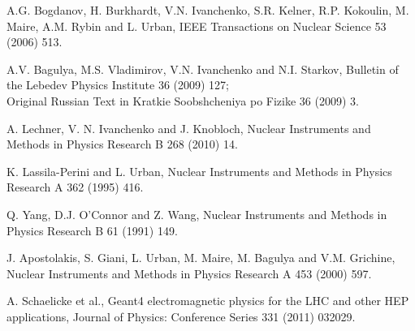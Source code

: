 
 A.G. Bogdanov, H. Burkhardt, V.N. Ivanchenko, S.R. Kelner,
                     R.P. Kokoulin, M. Maire, A.M. Rybin and L. Urban,
                     IEEE Transactions on Nuclear Science 53 (2006) 513.

 A.V. Bagulya, M.S. Vladimirov, V.N. Ivanchenko and N.I. Starkov,
                       Bulletin of the Lebedev Physics Institute 36 (2009) 127; \\
                       Original Russian Text in  
                       Kratkie Soobshcheniya po Fizike 36 (2009) 3. 

 A. Lechner, V. N. Ivanchenko and J. Knobloch, 
                      Nuclear Instruments and Methods in Physics Research B 268 (2010) 14.

 K. Lassila-Perini and L. Urban, 
                     Nuclear Instruments and Methods in Physics Research A 362 (1995) 416.

 Q. Yang, D.J. O'Connor and Z. Wang, 
                        Nuclear Instruments and Methods in Physics Research B 61 (1991) 149.

 J. Apostolakis, S. Giani, L. Urban, M. Maire, M. Bagulya and V.M. Grichine, 
                    Nuclear Instruments and Methods in Physics Research A 453 (2000) 597.

 A. Schaelicke et al., Geant4 electromagnetic physics for the LHC and
                       other HEP applications,
                       Journal of Physics: Conference Series 331 (2011) 032029.

